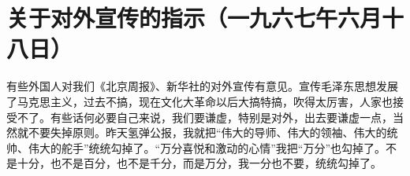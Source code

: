\section[关于对外宣传的指示（一九六七午六月十八日）]{关于对外宣传的指示（一九六七午六月十八日）}


有些外国人对我们《北京周报》、新华社的对外宣传有意见。宣传毛泽东思想发展了马克思主义，过去不搞，现在文化大革命以后大搞特搞，吹得太厉害，人家也接受不了。有些话何必要自己来说，我们要谦虚，特别是对外，出去要谦虚一点，当然就不要失掉原则。昨天氢弹公报，我就把“伟大的导师、伟大的领袖、伟大的统帅、伟大的舵手”统统勾掉了。“万分喜悦和激动的心情”我把“万分”也勾掉了。不是十分，也不是百分，也不是千分，而是万分，我一分也不要，统统勾掉了。


